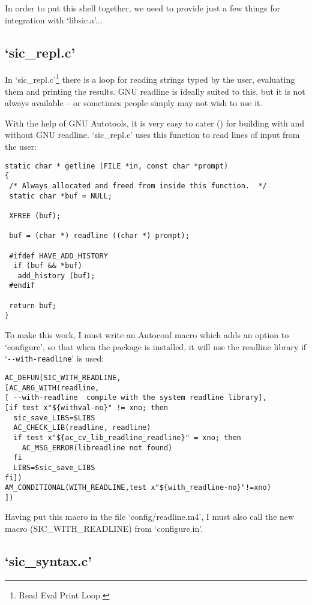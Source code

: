 In order to put this shell together, we need to provide just a few 
things for integration with `libsic.a'... 

\subsection{`sic\_{}repl.c'}


In `sic\_{}repl.c'\footnote{Read Eval Print Loop.} there is a loop for reading 
strings typed by the user, evaluating them and printing the results. GNU readline is ideally suited to this, but it is not always available -- or sometimes people simply may not wish to use it. 


With the help of GNU Autotools, it is very easy to cater ({\MjQ{}}) for 
building with and without GNU readline. `sic\_{}repl.c' uses this function 
to read lines of input from the user: 

\begin{Verbatim}[frame=single]
static char * getline (FILE *in, const char *prompt)
{
 /* Always allocated and freed from inside this function.  */
 static char *buf = NULL; 
                           
 XFREE (buf);

 buf = (char *) readline ((char *) prompt);

 #ifdef HAVE_ADD_HISTORY
  if (buf && *buf)
   add_history (buf);
 #endif
  
 return buf;
}
\end{Verbatim}

To make this work, I must write an Autoconf macro which adds an option 
to `configure', so that when the package is installed, it will use the 
readline library if `\verb+--with-readline+' is used: 

\begin{Verbatim}[frame=single]
AC_DEFUN(SIC_WITH_READLINE,
[AC_ARG_WITH(readline,
[ --with-readline  compile with the system readline library],
[if test x"${withval-no}" != xno; then
  sic_save_LIBS=$LIBS
  AC_CHECK_LIB(readline, readline)
  if test x"${ac_cv_lib_readline_readline}" = xno; then
    AC_MSG_ERROR(libreadline not found)
  fi
  LIBS=$sic_save_LIBS
fi])
AM_CONDITIONAL(WITH_READLINE,test x"${with_readline-no}"!=xno)
])
\end{Verbatim}

Having put this macro in the file `config/readline.m4', I must also call the new macro (SIC\_{}WITH\_{}READLINE) from `configure.in'. 

\subsection{`sic\_{}syntax.c'}


